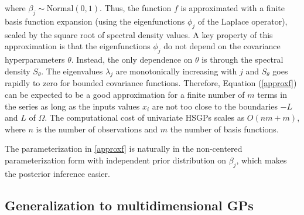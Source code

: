 \documentclass[]{interact}
\theoremstyle{plain}%
\theoremstyle{definition}
\theoremstyle{remark}
\begin{document}
\noindent where $\beta_j \sim \text{Normal}(0,1)$. Thus, the function $f$ is approximated with a finite basis function expansion (using the eigenfunctions $\phi_j$ of the Laplace operator), scaled by the square root of spectral density values. A key property of this approximation is that the eigenfunctions $\phi_j$ do not depend on the covariance hyperparameters $\theta$. Instead, the only dependence on $\theta$ is through the spectral density $S_{\theta}$. The eigenvalues $\lambda_j$ are monotonically increasing with $j$ and $S_{\theta}$ goes rapidly to zero for bounded covariance functions. Therefore, Equation (\ref{approxf}) can be expected to be a good approximation for a finite number of $m$ terms in the series as long as the inputs values $x_i$ are not too close to the boundaries $-L$ and $L$ of $\Omega$. The computational cost of univariate HSGPs scales as $O(nm + m)$, where $n$ is the number of observations and $m$ the number of basis functions.

The parameterization in \ref{approxf} is naturally in the non-centered
parameterization form with independent prior distribution on
$\beta_j$, which makes the posterior inference easier.

\subsection{Generalization to multidimensional GPs}
\end{document}
